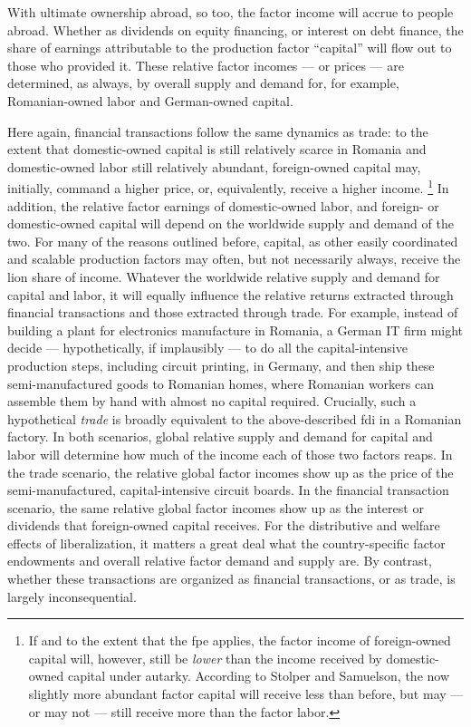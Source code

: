 \begin{enumerate}
	With ultimate ownership abroad, so too, the factor income will accrue to people abroad.
	Whether as dividends on equity financing, or interest on debt finance, the share of earnings attributable to the production factor ``capital'' will flow out to those who provided it.
	These relative factor incomes --- or prices --- are determined, as always, by overall supply and demand for, for example, Romanian-owned labor and German-owned capital.

	Here again, financial transactions follow the same dynamics as trade:
	to the extent that domestic-owned capital is still relatively scarce in Romania and domestic-owned labor still relatively abundant, foreign-owned capital may, initially, command a higher price, or, equivalently, receive a higher income.
	\footnote{
		If and to the extent that the \gls{fpe}  applies, the factor income of foreign-owned capital will, however, still be \emph{lower} than the income received by domestic-owned capital under autarky.
		According to Stolper and Samuelson, the now slightly more abundant factor capital will receive less than before, but may --- or may not --- still receive more than the factor labor.
	}
	In addition, the relative factor earnings of domestic-owned labor, and foreign- or domestic-owned capital will depend on the worldwide supply and demand of the two.
	For many of the reasons outlined before, capital, as other easily coordinated and scalable production factors may often, but not necessarily always, receive the lion share of income.
	Whatever the worldwide relative supply and demand for capital and labor, it will equally influence the relative returns extracted through financial transactions and those extracted through trade.
	For example, instead of building a plant for electronics manufacture in Romania, a German IT firm might decide --- hypothetically, if implausibly --- to do all the capital-intensive production steps, including circuit printing, in Germany, and then ship these semi-manufactured goods to Romanian homes, where Romanian workers can assemble them by hand with almost no capital required.
	Crucially, such a hypothetical \emph{trade} is broadly equivalent to the above-described \gls{fdi} in a Romanian factory.
	In both scenarios, global relative supply and demand for capital and labor will determine how much of the income each of those two factors reaps.
	In the trade scenario, the relative global factor incomes show up as the price of the semi-manufactured, capital-intensive circuit boards.
	In the financial transaction scenario, the same relative global factor incomes show up as the interest or dividends that foreign-owned capital receives.
	For the distributive and welfare effects of liberalization, it matters a great deal what the country-specific factor endowments and overall relative factor demand and supply are.
	By contrast, whether these transactions are organized as financial transactions, or as trade, is largely inconsequential.
\end{enumerate}

